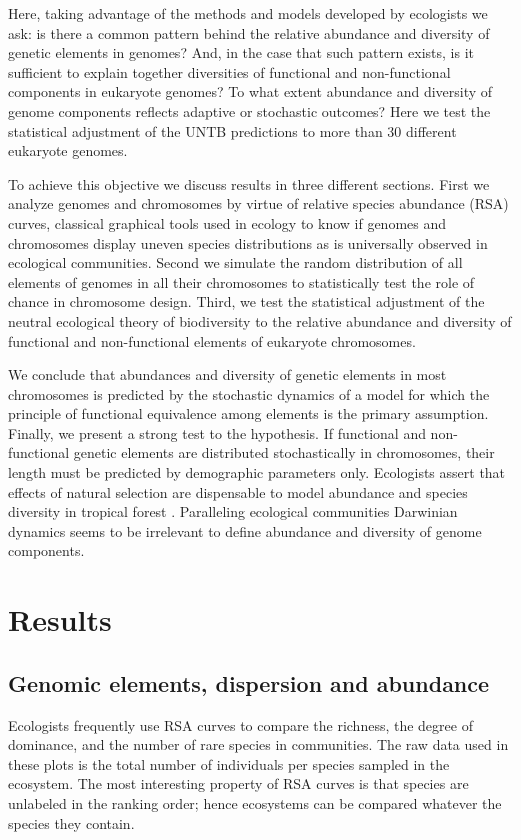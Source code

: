 Here, taking advantage of the methods and models developed by ecologists we ask: is there a common pattern behind the relative abundance and diversity of genetic elements in genomes? And, in the case that such pattern exists, is it sufficient to explain together diversities of  functional and non-functional components in eukaryote genomes? To what extent abundance and diversity of genome components reflects adaptive or stochastic outcomes? Here we test the statistical adjustment of the UNTB predictions to more than 30 different eukaryote genomes.

To achieve this objective we discuss results in three different sections. First we analyze genomes and chromosomes by virtue of relative species abundance (RSA) curves, classical graphical tools used in ecology to know if genomes and chromosomes display uneven species distributions as is universally observed in ecological communities. Second we simulate the random distribution of all elements of genomes in all their chromosomes to statistically test the role of chance in chromosome design. Third, we test the statistical adjustment of the neutral ecological theory of biodiversity to the relative abundance and diversity of functional and non-functional elements of eukaryote chromosomes.

We conclude that abundances and diversity of genetic elements in most chromosomes is predicted by the stochastic dynamics of a model for which the principle of functional equivalence among elements is the primary assumption. Finally, we present a strong test to the hypothesis. If functional and non-functional genetic elements are distributed stochastically in chromosomes, their length must be predicted by demographic parameters only. Ecologists assert that effects of natural selection are dispensable to model abundance and species diversity in tropical forest \cite{Jabot2011}. Paralleling ecological communities Darwinian dynamics seems to be irrelevant to define abundance and diversity of genome components.

\section{Results}

\subsection{Genomic elements, dispersion and abundance}

Ecologists frequently use RSA curves to compare the richness, the degree of dominance, and the number of rare species in communities. The raw data used in these plots is the total number of individuals per species sampled in the ecosystem. The most interesting property of RSA curves is that species are unlabeled in the ranking order; hence ecosystems can be compared whatever the species they contain.

